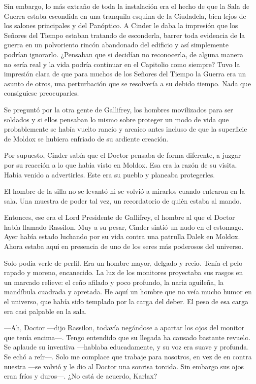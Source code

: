 Sin embargo, lo más extraño de toda la instalación era el hecho de que la Sala de Guerra estaba escondida en una tranquila esquina de la Ciudadela, bien lejos de los salones principales y del Panóptico. A Cinder le daba la impresión que los Señores del Tiempo estaban tratando de esconderla, barrer toda evidencia de la guerra en un polvoriento rincón abandonado del edificio y así simplemente podrían ignorarlo. ¿Pensaban que si decidían no reconocerla, de alguna manera no sería real y la vida podría continuar en el Capitolio como siempre? Tuvo la impresión clara de que para muchos de los Señores del Tiempo la Guerra era un asunto de otros, una perturbación que se resolvería a su debido tiempo. Nada que consiguiese preocuparles.

Se preguntó por la otra gente de Gallifrey, los hombres movilizados para ser soldados y si ellos pensaban lo mismo sobre proteger un modo de vida que probablemente se había vuelto rancio y arcaico antes incluso de que la superficie de Moldox se hubiera enfriado de su ardiente creación.

Por supuesto, Cinder sabía que el Doctor pensaba de forma diferente, a juzgar por su reacción a lo que había visto en Moldox. Esa era la razón de su visita. Había venido a advertirles. Este era su pueblo y planeaba protegerles.

El hombre de la silla no se levantó ni se volvió a mirarlos cuando entraron en la sala. Una muestra de poder tal vez, un recordatorio de quién estaba al mando.

Entonces, ese era el Lord Presidente de Gallifrey, el hombre al que el Doctor había llamado Rassilon. Muy a su pesar, Cinder sintió un nudo en el estomago. Ayer había estado luchando por su vida contra una patrulla Dalek en Moldox. Ahora estaba aquí en presencia de uno de los seres más poderosos del universo.

Solo podía verle de perfil. Era un hombre mayor, delgado y recio. Tenía el pelo rapado y moreno, encanecido. La luz de los monitores proyectaba sus rasgos en un marcado relieve: el ceño afilado y poco profundo, la nariz aguileña, la mandíbula cuadrada y apretada. He aquí un hombre que no veía mucho humor en el universo, que había sido templado por la carga del deber. El peso de esa carga era casi palpable en la sala.

—Ah, Doctor —dijo Rassilon, todavía negándose a apartar los ojos del monitor que tenía encima—. Tengo entendido que su llegada ha causado bastante revuelo. Se aplaude su inventiva —hablaba educadamente, y su voz era suave y profunda. Se echó a reír—. Solo me complace que trabaje para nosotros, en vez de en contra nuestra —se volvió y le dio al Doctor una sonrisa torcida. Sin embargo sus ojos eran fríos y duros—. ¿No está de acuerdo, Karlax?

